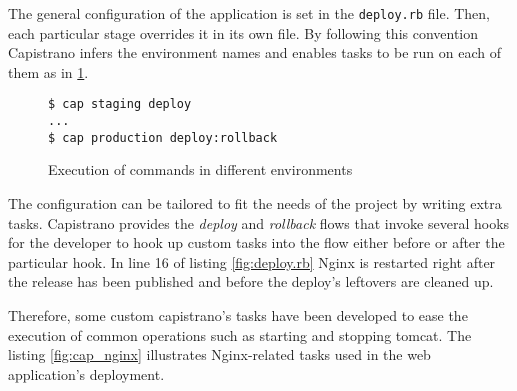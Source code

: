 The general configuration of the application is set in the \texttt{deploy.rb} file. Then, each particular stage overrides it in its own file. By following this convention Capistrano infers the environment names and enables tasks to be run on each of them as in \ref{fig:capistrano}.


\begin{figure}[h]
  \texttt{\$ cap staging deploy}\\
  \texttt{...}\\
  \texttt{\$ cap production deploy:rollback}\\
  \caption{Execution of commands in different environments}
  \label{fig:capistrano}
\end{figure}

The configuration can be tailored to fit the needs of the project by writing extra tasks. Capistrano provides the \textit{deploy} and \textit{rollback} flows that invoke several hooks for the developer to hook up custom tasks into the flow either before or after the particular hook. In line 16 of listing \ref{fig:deploy.rb} Nginx is restarted right after the release has been published and before the deploy's leftovers are cleaned up.

Therefore, some custom capistrano's tasks have been developed to ease the execution of common operations such as starting and stopping tomcat. The listing \ref{fig:cap_nginx} illustrates Nginx-related tasks used in the web application's deployment.

